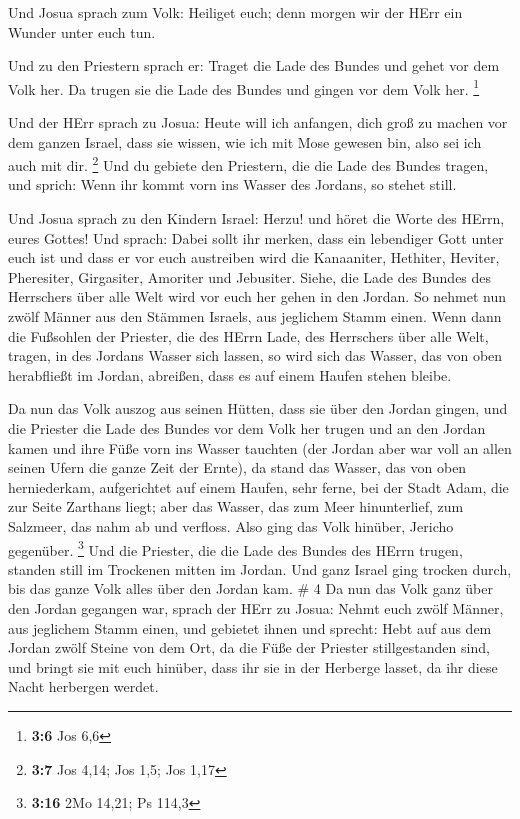  Und Josua sprach zum Volk: Heiliget euch; denn morgen wir
der HErr ein Wunder unter euch tun.

 Und zu den Priestern sprach er: Traget die Lade des Bundes
und gehet vor dem Volk her. Da trugen sie die Lade des Bundes und gingen
vor dem Volk her. \footnote{\textbf{3:6} Jos 6,6}

 Und der HErr sprach zu Josua: Heute will ich anfangen, dich
groß zu machen vor dem ganzen Israel, dass sie wissen, wie ich mit Mose
gewesen bin, also sei ich auch mit dir. \footnote{\textbf{3:7} Jos 4,14;
  Jos 1,5; Jos 1,17}  Und du gebiete den Priestern, die die
Lade des Bundes tragen, und sprich: Wenn ihr kommt vorn ins Wasser des
Jordans, so stehet still.

 Und Josua sprach zu den Kindern Israel: Herzu! und höret
die Worte des HErrn, eures Gottes!  Und sprach: Dabei sollt
ihr merken, dass ein lebendiger Gott unter euch ist und dass er vor euch
austreiben wird die Kanaaniter, Hethiter, Heviter, Pheresiter,
Girgasiter, Amoriter und Jebusiter.  Siehe, die Lade des
Bundes des Herrschers über alle Welt wird vor euch her gehen in den
Jordan.  So nehmet nun zwölf Männer aus den Stämmen
Israels, aus jeglichem Stamm einen.  Wenn dann die
Fußsohlen der Priester, die des HErrn Lade, des Herrschers über alle
Welt, tragen, in des Jordans Wasser sich lassen, so wird sich das
Wasser, das von oben herabfließt im Jordan, abreißen, dass es auf einem
Haufen stehen bleibe.

 Da nun das Volk auszog aus seinen Hütten, dass sie über
den Jordan gingen, und die Priester die Lade des Bundes vor dem Volk her
trugen  und an den Jordan kamen und ihre Füße vorn ins
Wasser tauchten (der Jordan aber war voll an allen seinen Ufern die
ganze Zeit der Ernte),  da stand das Wasser, das von oben
herniederkam, aufgerichtet auf einem Haufen, sehr ferne, bei der Stadt
Adam, die zur Seite Zarthans liegt; aber das Wasser, das zum Meer
hinunterlief, zum Salzmeer, das nahm ab und verfloss. Also ging das Volk
hinüber, Jericho gegenüber. \footnote{\textbf{3:16} 2Mo 14,21; Ps 114,3}
 Und die Priester, die die Lade des Bundes des HErrn
trugen, standen still im Trockenen mitten im Jordan. Und ganz Israel
ging trocken durch, bis das ganze Volk alles über den Jordan kam. \# 4
 Da nun das Volk ganz über den Jordan gegangen war, sprach
der HErr zu Josua:  Nehmt euch zwölf Männer, aus jeglichem
Stamm einen,  und gebietet ihnen und sprecht: Hebt auf aus
dem Jordan zwölf Steine von dem Ort, da die Füße der Priester
stillgestanden sind, und bringt sie mit euch hinüber, dass ihr sie in
der Herberge lasset, da ihr diese Nacht herbergen werdet.

